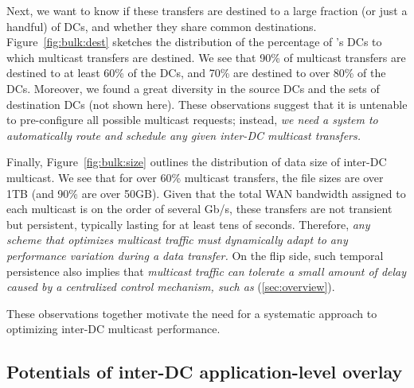 Next, we want to know if these transfers are destined to a large
fraction (or just a handful) of DCs, and whether they share common
destinations. Figure~\ref{fig:bulk:dest} sketches the distribution
of the percentage of \company's DCs to which multicast transfers
are destined. We see that 90\% of multicast transfers are destined to
at least 60\% of the DCs, and 70\% are destined to over 80\% of the DCs. Moreover,
we found a great diversity in the source DCs and the sets of destination
DCs (not shown here). These observations suggest that it is untenable
to pre-configure all possible multicast requests; instead, {\em we
need a system to automatically route and schedule any given inter-DC
multicast transfers.}

Finally, Figure~\ref{fig:bulk:size} outlines the distribution of data
size of inter-DC multicast. We see that for over 60\% multicast
transfers, the file sizes are over 1TB (and 90\% are over 50GB).
Given that the total WAN bandwidth assigned to each multicast is on
the order of several Gb/s, these transfers are not transient but
persistent, typically lasting for at least tens of seconds.
Therefore, {\em any scheme that optimizes multicast traffic must
dynamically adapt to any performance variation during a data transfer.}
On the flip side, such temporal persistence also implies that {\em
multicast traffic can tolerate a small amount of delay caused by
a centralized control mechanism, such as \name}
(\Section\ref{sec:overview}).


\vspace{0.1cm}
These observations together motivate the need for a systematic approach
to optimizing inter-DC multicast performance.

\subsection{Potentials of inter-DC application-level overlay}
\label{subsec:motivation:case-for}

